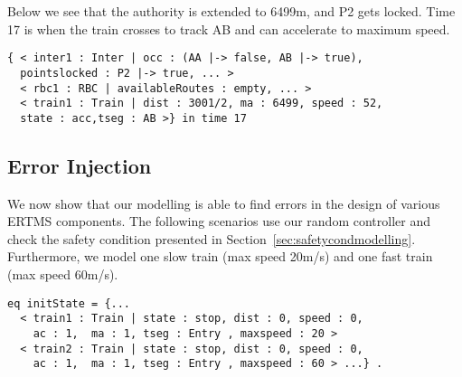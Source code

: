 Below we see that the authority is extended to 6499m, and P2 gets
locked. Time 17 is when the train crosses to track AB and can
accelerate to maximum speed.
\begin{lstlisting}
{ < inter1 : Inter | occ : (AA |-> false, AB |-> true),
  pointslocked : P2 |-> true, ... >
  < rbc1 : RBC | availableRoutes : empty, ... >
  < train1 : Train | dist : 3001/2, ma : 6499, speed : 52,
  state : acc,tseg : AB >} in time 17
\end{lstlisting}




\subsection{Error Injection}
\label{sec:errorInjection}
We now show that our modelling is able to find errors in the design of various ERTMS components.  The following scenarios use our random
controller and check the safety condition presented in
Section~\ref{sec:safetycondmodelling}.  Furthermore, we model one slow train (max speed 20m/s) and one
fast train (max speed 60m/s).

\begin{lstlisting}
eq initState = {...
  < train1 : Train | state : stop, dist : 0, speed : 0,
    ac : 1,  ma : 1, tseg : Entry , maxspeed : 20 >
  < train2 : Train | state : stop, dist : 0, speed : 0,
    ac : 1,  ma : 1, tseg : Entry , maxspeed : 60 > ...} .
\end{lstlisting}


